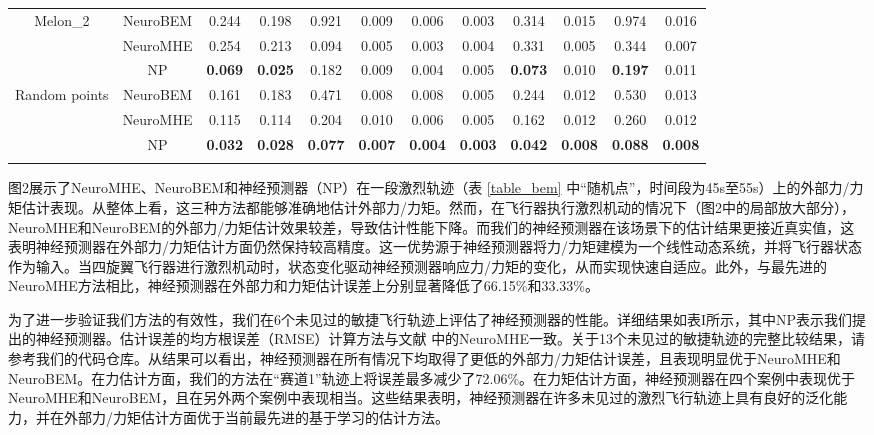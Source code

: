 \documentclass[lang=chs, degree=master, blindreview=false, winfonts=true]{yanputhesis}
\begin{document}
\begin{table}[h]
\begin{tabular}{c c c c c c c c c c c c}
	\hline
	\multirow{3}{*}{Melon\_2} & NeuroBEM & 0.244 & 0.198 & 0.921 & 0.009 & 0.006 & 0.003 & 0.314 & 0.015 & 0.974 & 0.016 \\
	& NeuroMHE & 0.254 & 0.213 & 0.094 & 0.005 & 0.003 & 0.004 & 0.331 & 0.005 & 0.344 & 0.007 \\
	& NP & \textbf{0.069} & \textbf{0.025} & 0.182 & 0.009 & 0.004 & 0.005 & \textbf{0.073} & 0.010 & \textbf{0.197} & 0.011 \\
	\hline
	\multirow{3}{*}{Random points} & NeuroBEM & 0.161 & 0.183 & 0.471 & 0.008 & 0.008 & 0.005 & 0.244 & 0.012 & 0.530 & 0.013 \\
	& NeuroMHE & 0.115 & 0.114 & 0.204 & 0.010 & 0.006 & 0.005 & 0.162 & 0.012 & 0.260 & 0.012 \\
	& NP & \textbf{0.032} & \textbf{0.028} & \textbf{0.077} & \textbf{0.007} & \textbf{0.004} & \textbf{0.003} & \textbf{0.042} & \textbf{0.008} & \textbf{0.088} & \textbf{0.008} \\
	\Xhline{1.pt}
\end{tabular}
\end{table}

图2展示了NeuroMHE、NeuroBEM和神经预测器（NP）在一段激烈轨迹（表 \ref{table_bem} 中“随机点”，时间段为45s至55s）上的外部力/力矩估计表现。从整体上看，这三种方法都能够准确地估计外部力/力矩。然而，在飞行器执行激烈机动的情况下（图2中的局部放大部分），NeuroMHE和NeuroBEM的外部力/力矩估计效果较差，导致估计性能下降。而我们的神经预测器在该场景下的估计结果更接近真实值，这表明神经预测器在外部力/力矩估计方面仍然保持较高精度。这一优势源于神经预测器将力/力矩建模为一个线性动态系统，并将飞行器状态作为输入。当四旋翼飞行器进行激烈机动时，状态变化驱动神经预测器响应力/力矩的变化，从而实现快速自适应。此外，与最先进的NeuroMHE方法相比，神经预测器在外部力和力矩估计误差上分别显著降低了66.15\%和33.33\%。

为了进一步验证我们方法的有效性，我们在6个未见过的敏捷飞行轨迹上评估了神经预测器的性能。详细结果如表I所示，其中NP表示我们提出的神经预测器。估计误差的均方根误差（RMSE）计算方法与文献 \cite{Wang2024e} 中的NeuroMHE一致。关于13个未见过的敏捷轨迹的完整比较结果，请参考我们的代码仓库。从结果可以看出，神经预测器在所有情况下均取得了更低的外部力/力矩估计误差，且表现明显优于NeuroMHE和NeuroBEM。在力估计方面，我们的方法在“赛道1”轨迹上将误差最多减少了72.06\%。在力矩估计方面，神经预测器在四个案例中表现优于NeuroMHE和NeuroBEM，且在另外两个案例中表现相当。这些结果表明，神经预测器在许多未见过的激烈飞行轨迹上具有良好的泛化能力，并在外部力/力矩估计方面优于当前最先进的基于学习的估计方法。
\end{document}
